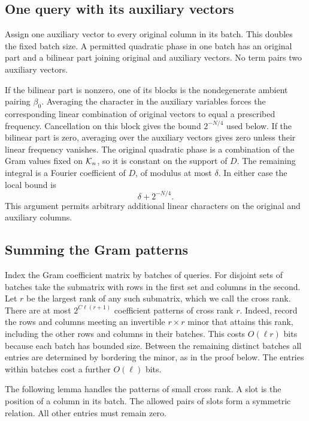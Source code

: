 \subsection{One query with its auxiliary vectors}

Assign one auxiliary vector to every original column in its batch.
This doubles the fixed batch size. A permitted quadratic phase in one
batch has an original part and a bilinear part joining original and
auxiliary vectors. No term pairs two auxiliary vectors.

If the bilinear part is nonzero, one of its blocks is the
nondegenerate ambient pairing \(\beta_0\). Averaging the character in
the auxiliary variables forces the corresponding linear combination
of original vectors to equal a prescribed frequency. Cancellation on
this block gives the bound \(2^{-N/4}\) used below.
If the bilinear part is zero, averaging over the auxiliary vectors gives
zero unless their linear frequency vanishes. The original quadratic
phase is a combination of the Gram values fixed on \(\mathcal K_n\), so it is
constant on the support of \(D\). The remaining integral is a Fourier
coefficient of \(D\), of modulus at most \(\delta\).
In either case the local bound is
\begin{equation}\label{eq:auxiliary-local}
 \delta+2^{-N/4}.
\end{equation}
This argument permits arbitrary additional linear characters on the
original and auxiliary columns.

\subsection{Summing the Gram patterns}

Index the Gram coefficient matrix by batches of queries. For disjoint
sets of batches take the submatrix with rows in the first set and
columns in the second. Let \(r\) be the largest rank of any such
submatrix, which we call the cross rank. There are at most
\(2^{C\ell(r+1)}\) coefficient patterns of cross rank \(r\). Indeed,
record the rows and columns meeting an invertible \(r\times r\) minor
that attains this rank, including the other rows and columns in their
batches. This costs \(O(\ell r)\) bits because each batch has bounded
size. Between the remaining distinct batches all entries are determined
by bordering the minor, as in the proof below. The entries within
batches cost a further \(O(\ell)\) bits.

The following lemma handles the patterns of small cross rank. A slot is
the position of a column in its batch. The allowed pairs of slots form
a symmetric relation. All other entries must remain zero.

